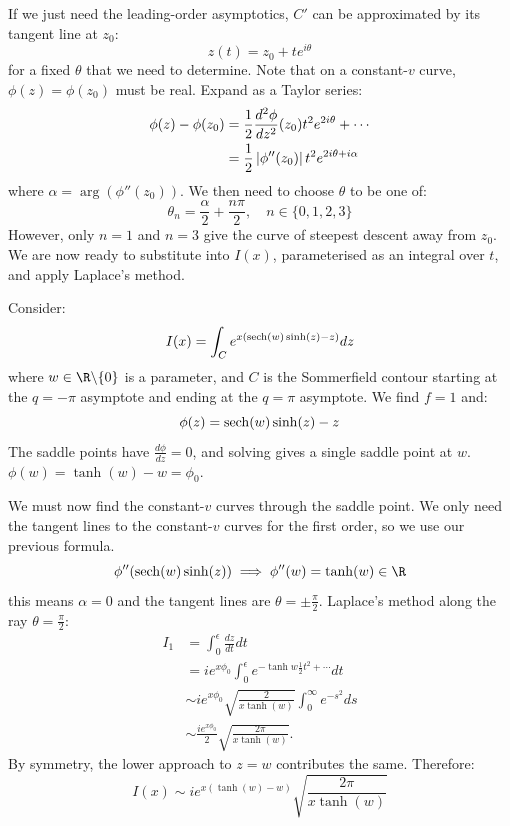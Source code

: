 \documentclass[../Main.tex]{subfiles}
\begin{document}
If we just need the leading-order asymptotics, $C'$ can be approximated by its tangent line at $z_0$:
\begin{equation*}
    z(t) = z_0 + te^{i\theta}
\end{equation*}
for a fixed $\theta$ that we need to determine. Note that on a constant-$v$ curve, $\phi(z) = \phi(z_0)$ must be real. Expand as a Taylor series:
\begin{align*}
    \phi(z) - \phi(z_0) &= \frac12 \frac{d^{2}\phi}{dz^{2}}(z_0) t^2 e^{2i\theta} + \cdots \\
    &= \frac12 \left|\phi''(z_0)\right| t^2 e^{2i\theta + i\alpha}
\end{align*}
where $\alpha = \operatorname{arg}(\phi''(z_0))$. We then need to choose $\theta$ to be one of:
\begin{equation*}
    \theta_n = \frac\alpha2 + \frac{n\pi}{2},\quad n \in \{0, 1, 2, 3\}
\end{equation*}
However, only $n = 1$ and $n = 3$ give the curve of steepest descent away from $z_0$. We are now ready to substitute into $I(x)$, parameterised as an integral over $t$, and apply Laplace's method.
\begin{example}
    \label{exDebye}
    Consider:
    \begin{equation*}
        I(x) = \int_C e^{x(\operatorname{sech}(w)\sinh(z) - z)} dz
    \end{equation*}
    where $w \in \R \backslash \{0\}$ is a parameter, and $C$ is the Sommerfield contour starting at the $q = -\pi$ asymptote and ending at the $q = \pi$ asymptote. We find $f = 1$ and:
    \begin{equation*}
        \phi(z) = \operatorname{sech}(w) \sinh(z) - z
    \end{equation*}
    The saddle points have $\frac{d\phi}{dz} = 0$, and solving gives a single saddle point at $w$. $\phi(w) = \tanh(w) - w = \phi_0$.

    We must now find the constant-$v$ curves through the saddle point. We only need the tangent lines to the constant-$v$ curves for the first order, so we use our previous formula.
    \begin{equation*}
        \phi''(\sech(w)\sinh(z)) \implies \phi''(w) = \tanh(w) \in \R
    \end{equation*}
    this means $\alpha = 0$ and the tangent lines are $\theta = \pm \frac{\pi}{2}$. Laplace's method along the ray $\theta = \frac\pi2$:
    \begin{align*}
        I_1 &= \int_{0}^{\epsilon} \frac{dz}{dt} dt \\
        &= i e^{x\phi_0} \int_{0}^{\epsilon} e^{-\tanh w \frac12 t^2 + \cdots} dt \\
        &\sim ie^{x \phi_0} \sqrt{\frac{2}{x\tanh(w)}} \int_{0}^{\infty} e^{-s^2} ds \\
        &\sim \frac{ie^{x \phi_0}}{2} \sqrt{\frac{2\pi}{x\tanh(w)}}.
    \end{align*}
    By symmetry, the lower approach to $z = w$ contributes the same. Therefore:
    \begin{equation*}
        I(x) \sim ie^{x(\tanh(w) - w)} \sqrt{\frac{2\pi}{x\tanh(w)}}
    \end{equation*}
\end{example}
\end{document}
